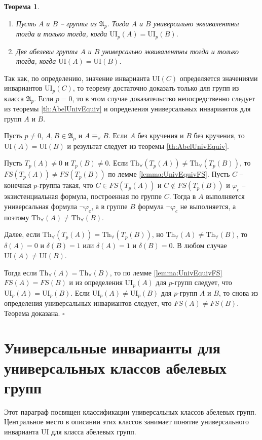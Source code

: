 \documentclass[a4paper,11pt,twoside]{article}
\newtheorem{theorem}{Теорема}[section]
\def\proof{{\noindent{\bf Доказательство.}} }
\def\A{{\mathfrak{A}}}
\def\Tha{{\mathrm{Th}_\forall}}
\def\ui{{\mathrm{UI}}}
\begin{document}
\begin{theorem}\label{th:UnivEquivOfGroups}
\begin{enumerate}
\item Пусть $A$ и $B$ -- группы из $\A_p$. Тогда $A$ и $B$ универсально эквивалентны тогда и только тогда, когда $\ui_p(A) = \ui_p(B)$.
\item Две абелевы группы $A$ и $B$ универсально эквивалентны тогда и только тогда, когда $\ui(A) = \ui(B)$.
\end{enumerate}
\end{theorem}


\proof Так как, по определению, значение инварианта $\ui(C)$ определяется значениями инвариантов $\ui_p(C)$, то теорему достаточно доказать только для групп из класса $\A_p$. Если $p=0$, то в этом случае доказательство непосредственно следует из теоремы \ref{th:AbelUnivEquiv} и определения универсальных инвариантов для групп $A$ и $B$.

Пусть $p \neq 0$, $A, B \in \A_p$ и $A \equiv_\forall B$. Если $A$ без кручения и $B$ без кручения, то $\ui(A) = \ui(B)$ и результат следует из теоремы \ref{th:AbelUnivEquiv}.

Пусть $T_p(A) \neq 0$ и $T_p(B) \neq 0$. Если $\Tha(T_p(A)) \neq \Tha(T_p(B))$, то $FS(T_p(A)) \neq FS(T_p(B))$ по лемме \ref{lemma:UnivEquivFS}. Пусть $C$ -- конечная $p$-группа такая, что $C \in FS(T_p(A))$ и $C \notin FS(T_p(B))$ и $\varphi_c$ -- экзистенциальная формула, построенная по группе $C$. Тогда в $A$ выполняется универсальная формула $\neg \varphi_c$, а в группе $B$ формула $\neg \varphi_c$ не выполняется, а поэтому $\Tha(A) \neq \Tha(B)$.

Далее, если $\Tha(T_p(A)) = \Tha(T_p(B))$, но $\Tha(A) \neq \Tha(B)$, то $\delta(A) = 0$ и $\delta(B) = 1$ или $\delta(A) = 1$ и $\delta(B) = 0$. В любом случае $\ui(A) \neq \ui(B)$. 

Тогда если $\Tha(A) = \Tha(B)$, то по лемме \ref{lemma:UnivEquivFS} $FS(A) = FS(B)$ и из определения $\ui_p(A)$ для $p$-групп следует, что $\ui_p(A) = \ui_p(B)$. Если $\ui_p(A) \neq \ui_p(B)$ для $p$-групп $A$ и $B$, то снова из определения универсальных инвариантов следует, что $FS(A) \neq FS(B)$. Теорема доказана. $\square$


\section{Универсальные инварианты для универсальных классов абелевых групп}

Этот параграф посвящен классификации универсальных классов абелевых групп. Центральное место в описании этих классов занимает понятие универсального инварианта $\ui$ для класса абелевых групп. 
\end{document}
